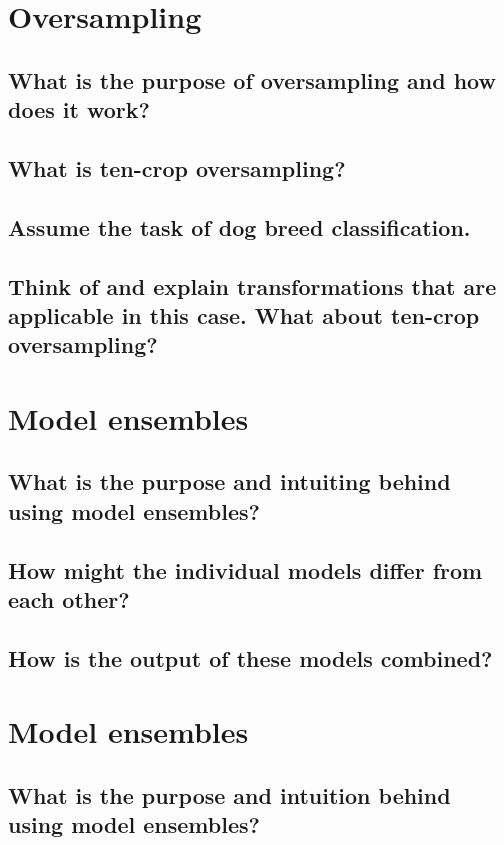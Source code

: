 \section{Oversampling}

\subsection{What is the purpose of oversampling and how does it work?}

\subsection{What is ten-crop oversampling?}

\subsection{Assume the task of dog breed classification.}

\subsection{Think of and explain transformations that are applicable in this case. What about ten-crop oversampling?}

\section{Model ensembles}

\subsection{What is the purpose and intuiting behind using model ensembles?}

\subsection{How might the individual models differ from each other?}

\subsection{How is the output of these models combined?}

\section{Model ensembles}

\subsection{What is the purpose and intuition behind using model ensembles?}

